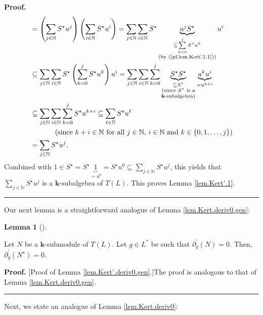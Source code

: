 \documentclass[numbers=enddot,12pt,final,onecolumn,notitlepage]{scrartcl}%
\theoremstyle{definition}
\newtheorem{lem}[theo]{Lemma}
\newenvironment{lemma}[1][]
{\begin{lem}[#1]\begin{leftbar}}
{\end{leftbar}\end{lem}}
\newenvironment{proof}[1][Proof]{\noindent\textbf{#1.} }{\ \rule{0.5em}{0.5em}}
\let\sumnonlimits\sum
\renewcommand{\sum}{\sumnonlimits\limits}
\begin{document}
\begin{proof}
\begin{align*}
&  =\left(  \sum_{j\in\mathbb{N}}S^{\star}u^{j}\right)  \left(  \sum
_{i\in\mathbb{N}}S^{\star}u^{i}\right)  =\sum_{j\in\mathbb{N}}\sum
_{i\in\mathbb{N}}S^{\star}\underbrace{u^{j}S^{\star}}_{\substack{\subseteq
\sum_{k=0}^{j}S^{\star}u^{k}\\\text{(by (\ref{pf.lem.Kert'.1.1}))}}}u^{i}\\
&  \subseteq\sum_{j\in\mathbb{N}}\sum_{i\in\mathbb{N}}S^{\star}\left(
\sum_{k=0}^{j}S^{\star}u^{k}\right)  u^{i}=\sum_{j\in\mathbb{N}}\sum
_{i\in\mathbb{N}}\sum_{k=0}^{j}\underbrace{S^{\star}S^{\star}}%
_{\substack{\subseteq S^{\star}\\\text{(since }S^{\star}\text{ is
a}\\\mathbf{k}\text{-subalgebra)}}}\underbrace{u^{k}u^{i}}_{=u^{k+i}}\\
&  \subseteq\sum_{j\in\mathbb{N}}\sum_{i\in\mathbb{N}}\sum_{k=0}^{j}S^{\star
}u^{k+i}\subseteq\sum_{\ell\in\mathbb{N}}S^{\star}u^{\ell}\\
&  \ \ \ \ \ \ \ \ \ \ \left(  \text{since }k+i\in\mathbb{N}\text{ for all
}j\in\mathbb{N}\text{, }i\in\mathbb{N}\text{ and }k\in\left\{  0,1,\ldots
,j\right\}  \right) \\
&  =\sum_{j\in\mathbb{N}}S^{\star}u^{j}.
\end{align*}
Combined with $1\in S^{\star}=S^{\star}\underbrace{1}_{=u^{0}}=S^{\star}%
u^{0}\subseteq\sum_{j\in\mathbb{N}}S^{\star}u^{j}$, this yields that
$\sum_{j\in\mathbb{N}}S^{\star}u^{j}$ is a $\mathbf{k}$-subalgebra of
$T\left(  L\right)  $. This proves Lemma \ref{lem.Kert'.1}.
\end{proof}

Our next lemma is a straightforward analogue of Lemma
\ref{lem.Kert.deriv0.gen}:

\begin{lemma}
\label{lem.Kert'.deriv0.gen}Let $N$ be a $\mathbf{k}$-submodule of $T\left(
L\right)  $. Let $g\in L^{\ast}$ be such that $\partial_{g}^{\prime}\left(
N\right)  =0$. Then, $\partial_{g}^{\prime}\left(  N^{\star}\right)  =0$.
\end{lemma}

\begin{proof}
[Proof of Lemma \ref{lem.Kert'.deriv0.gen}.]The proof is analogous to that of
Lemma \ref{lem.Kert.deriv0.gen}.
\end{proof}

Next, we state an analogue of Lemma \ref{lem.Kert.deriv0}:
\end{document}
